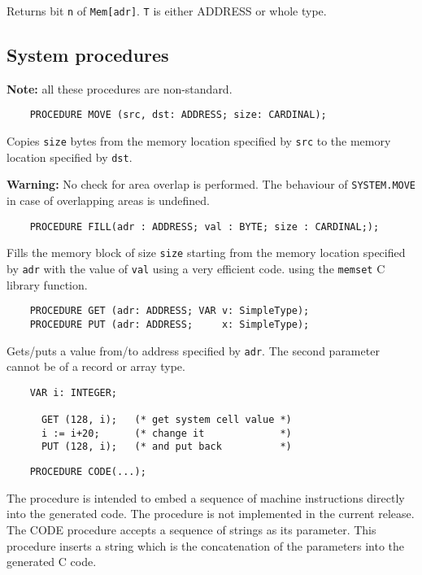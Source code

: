 Returns bit \verb|n| of \verb|Mem[adr]|.
\verb|T| is either ADDRESS or whole type.

\subsection{System procedures}

{\bf Note:} all these procedures are non-standard.

\verb'    PROCEDURE MOVE (src, dst: ADDRESS; size: CARDINAL);'

Copies \verb|size| bytes from the memory location specified
by \verb|src| to the memory location specified by \verb|dst|.

{\bf Warning:} No check for area overlap is performed. The behaviour
of \verb'SYSTEM.MOVE' in case of overlapping areas is undefined.

\verb'    PROCEDURE FILL(adr : ADDRESS; val : BYTE; size : CARDINAL;);'

Fills the memory block of size \verb'size' starting from the memory
location specified by \verb'adr' with the value of \verb'val'
\ifgencode
using a very efficient code.
\else
using the \verb'memset' C library function.
\fi

\verb'    PROCEDURE GET (adr: ADDRESS; VAR v: SimpleType);'\\
\verb'    PROCEDURE PUT (adr: ADDRESS;     x: SimpleType);'

Gets/puts a value from/to address specified by \verb|adr|.
The second parameter cannot be of a record or array type.

\begin{verbatim}
    VAR i: INTEGER;

      GET (128, i);   (* get system cell value *)
      i := i+20;      (* change it             *)
      PUT (128, i);   (* and put back          *)
\end{verbatim}

\verb'    PROCEDURE CODE(...);'

\ifgencode
The procedure is intended to embed a sequence of machine
instructions  directly into the generated code. The procedure is not
implemented in the current release.
\fi
\ifgenc
The CODE procedure accepts a sequence of strings as its
parameter. This procedure inserts a string which is the concatenation
of the parameters into the generated C code.


